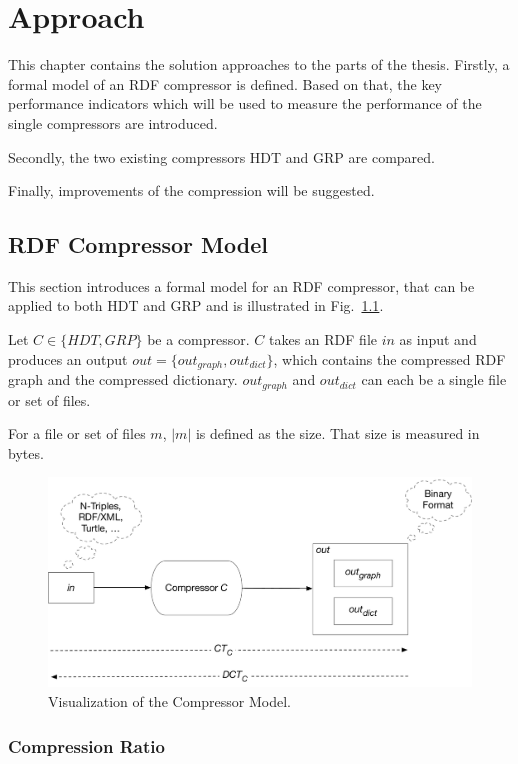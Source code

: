 \chapter{Approach}\label{ch:approach}

This chapter contains the solution approaches to the parts of the thesis. Firstly, a formal model of an RDF compressor is defined. Based on that, the key performance indicators which will be used to measure the performance of the single compressors are introduced.

Secondly, the two existing compressors HDT and GRP are compared.

Finally, improvements of the compression will be suggested.

\section{RDF Compressor Model}\label{sec:compressorModel}

This section introduces a formal model for an RDF compressor, that can be applied to both HDT and GRP and is illustrated in Fig.~\ref{fig:compressorModel}.

Let $C \in \{HDT,GRP\}$ be a compressor. $C$ takes an RDF file $in$ as input and produces an output $out=\{out_{graph}, out_{dict}\}$, which contains the compressed RDF graph and the compressed dictionary. $out_{graph}$ and $out_{dict}$ can each be a single file or set of files. 

For a file or set of files $m$, $|m|$ is defined as the size. That size is measured in bytes.

\begin{figure}
	\centering
	\includegraphics[width=0.9\linewidth]{figures/approach/model}
	\caption{Visualization of the Compressor Model.}
	\label{fig:compressorModel}
\end{figure}


\subsection{Compression Ratio}

